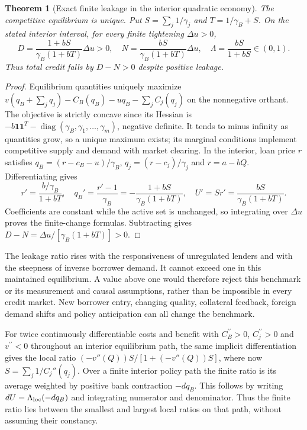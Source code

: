 \documentclass[11pt]{article}
\newtheorem{theorem}{Theorem}
\theoremstyle{remark}
\newcommand{\diag}{\operatorname{diag}}
\begin{document}
\begin{theorem}[Exact finite leakage in the interior quadratic economy]
The competitive equilibrium is unique. Put
$S=\sum_j1/\gamma_j$ and $T=1/\gamma_B+S$. On the stated interior
interval, for every finite tightening $\Delta u>0$,
\[
 D=\frac{1+bS}{\gamma_B(1+bT)}\Delta u>0,
 \quad N=\frac{bS}{\gamma_B(1+bT)}\Delta u,
 \quad \Lambda=\frac{bS}{1+bS}\in(0,1).                          \tag{1}
\]
Thus total credit falls by $D-N>0$ despite positive leakage.
\end{theorem}
\begin{proof}
Equilibrium quantities uniquely maximize
$v(q_B+\sum_jq_j)-C_B(q_B)-uq_B-\sum_jC_j(q_j)$ on the nonnegative
orthant. The objective is strictly concave since its Hessian is
$-b\mathbf1\mathbf1^T-\diag(\gamma_B,\gamma_1,\ldots,\gamma_m)$,
negative definite. It tends to minus infinity as quantities grow, so a
unique maximum exists; its marginal conditions implement competitive
supply and demand with market clearing. In the interior, loan price $r$
satisfies
$q_B=(r-c_B-u)/\gamma_B$, $q_j=(r-c_j)/\gamma_j$ and $r=a-bQ$.
Differentiating gives
\[
 r'=\frac{b/\gamma_B}{1+bT},\quad
 q_B'=\frac{r'-1}{\gamma_B}
       =-\frac{1+bS}{\gamma_B(1+bT)},\quad
 U'=Sr'=\frac{bS}{\gamma_B(1+bT)}.
\]
Coefficients are constant while the active set is unchanged, so integrating
over $\Delta u$ proves the finite-change formulas. Subtracting gives
$D-N=\Delta u/[\gamma_B(1+bT)]>0$.
\end{proof}
The leakage ratio rises with the responsiveness of unregulated lenders
and with the steepness of inverse borrower demand. It cannot exceed one
in this maintained equilibrium. A value above one would therefore reject
this benchmark or its measurement and causal assumptions, rather than
be impossible in every credit market. New borrower entry, changing quality,
collateral feedback, foreign demand shifts and policy anticipation can
all change the benchmark.

For twice continuously differentiable costs and benefit with
$C_B^{\prime\prime}>0$, $C_j^{\prime\prime}>0$ and $v^{\prime\prime}<0$
throughout an interior equilibrium path, the same implicit
differentiation gives the local ratio
$(-v''(Q))S/[1+(-v''(Q))S]$, where now $S=\sum_j1/C_j''(q_j)$.
Over a finite interior policy path the finite ratio is its average weighted
by positive bank contraction $-dq_B$. This follows by writing
$dU=\Lambda_{\rm loc}(-dq_B)$ and integrating numerator and denominator.
Thus the finite ratio lies between the smallest and largest local ratios
on that path, without assuming their constancy.
\end{document}
